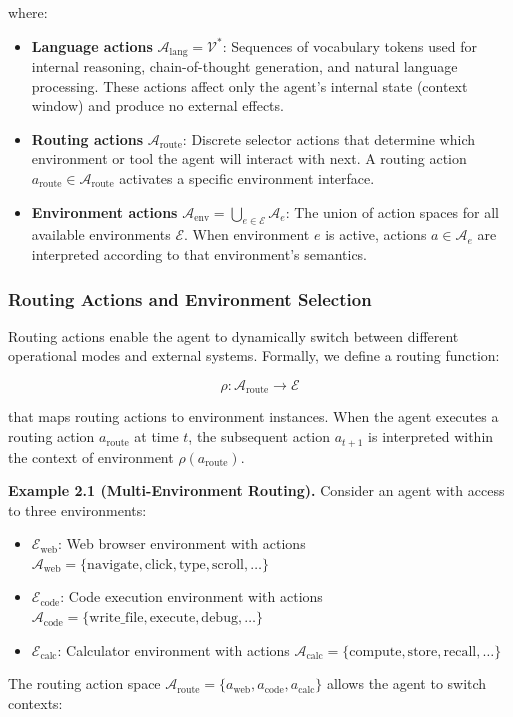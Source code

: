 where:

\begin{itemize}
    \item \textbf{Language actions} $\mathcal{A}_{\text{lang}} = \mathcal{V}^*$: Sequences of vocabulary tokens used for internal reasoning, chain-of-thought generation, and natural language processing. These actions affect only the agent's internal state (context window) and produce no external effects.

    \item \textbf{Routing actions} $\mathcal{A}_{\text{route}}$: Discrete selector actions that determine which environment or tool the agent will interact with next. A routing action $a_{\text{route}} \in \mathcal{A}_{\text{route}}$ activates a specific environment interface.

    \item \textbf{Environment actions} $\mathcal{A}_{\text{env}} = \bigcup_{e \in \mathcal{E}} \mathcal{A}_e$: The union of action spaces for all available environments $\mathcal{E}$. When environment $e$ is active, actions $a \in \mathcal{A}_e$ are interpreted according to that environment's semantics.

\end{itemize}

\subsubsection{Routing Actions and Environment Selection}

Routing actions enable the agent to dynamically switch between different operational modes and external systems. Formally, we define a routing function:

$$\rho: \mathcal{A}_{\text{route}} \rightarrow \mathcal{E}$$

that maps routing actions to environment instances. When the agent executes a routing action $a_{\text{route}}$ at time $t$, the subsequent action $a_{t+1}$ is interpreted within the context of environment $\rho(a_{\text{route}})$.

\textbf{Example 2.1 (Multi-Environment Routing).} Consider an agent with access to three environments:
\begin{itemize}
    \item $\mathcal{E}_{\text{web}}$: Web browser environment with actions $\mathcal{A}_{\text{web}} = \{\text{navigate}, \text{click}, \text{type}, \text{scroll}, \ldots\}$
    \item $\mathcal{E}_{\text{code}}$: Code execution environment with actions $\mathcal{A}_{\text{code}} = \{\text{write\_file}, \text{execute}, \text{debug}, \ldots\}$
    \item $\mathcal{E}_{\text{calc}}$: Calculator environment with actions $\mathcal{A}_{\text{calc}} = \{\text{compute}, \text{store}, \text{recall}, \ldots\}$

\end{itemize}
The routing action space $\mathcal{A}_{\text{route}} = \{a_{\text{web}}, a_{\text{code}}, a_{\text{calc}}\}$ allows the agent to switch contexts:

